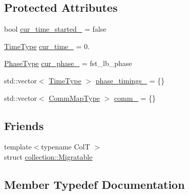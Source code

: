 \subsection*{Protected Attributes}
\begin{DoxyCompactItemize}
\item 
bool \hyperlink{structvt_1_1vrt_1_1collection_1_1balance_1_1_element_stats_a4fa029e81c6907ace700b8c3df10457f}{cur\+\_\+time\+\_\+started\+\_\+} = false
\item 
\hyperlink{namespacevt_a876a9d0cd5a952859c72de8a46881442}{Time\+Type} \hyperlink{structvt_1_1vrt_1_1collection_1_1balance_1_1_element_stats_ab0538c11d7a658e43f80c48023f7b8c6}{cur\+\_\+time\+\_\+} = 0.
\item 
\hyperlink{structvt_1_1vrt_1_1collection_1_1balance_1_1_element_stats_a6edee983bb2ae96a341763520af33c66}{Phase\+Type} \hyperlink{structvt_1_1vrt_1_1collection_1_1balance_1_1_element_stats_a661531ffc78883018a8e553179f9324d}{cur\+\_\+phase\+\_\+} = fst\+\_\+lb\+\_\+phase
\item 
std\+::vector$<$ \hyperlink{namespacevt_a876a9d0cd5a952859c72de8a46881442}{Time\+Type} $>$ \hyperlink{structvt_1_1vrt_1_1collection_1_1balance_1_1_element_stats_ac3df7cd0b637aef1e0faa92bb0193542}{phase\+\_\+timings\+\_\+} = \{\}
\item 
std\+::vector$<$ \hyperlink{namespacevt_1_1vrt_1_1collection_1_1balance_aa50d4cbbfa3c643e7303fc6e08f411fb}{Comm\+Map\+Type} $>$ \hyperlink{structvt_1_1vrt_1_1collection_1_1balance_1_1_element_stats_a1673ce54a075060ea7e04c6e300b9682}{comm\+\_\+} = \{\}
\end{DoxyCompactItemize}
\subsection*{Friends}
\begin{DoxyCompactItemize}
\item 
{\footnotesize template$<$typename ColT $>$ }\\struct \hyperlink{structvt_1_1vrt_1_1collection_1_1balance_1_1_element_stats_a7bbe05894c87d4c1c75375b8be72934d}{collection\+::\+Migratable}
\end{DoxyCompactItemize}


\subsection{Member Typedef Documentation}
\mbox{\label{structvt_1_1vrt_1_1collection_1_1balance_1_1_element_stats_a0c7e7b8fa38003b72320906f18a6ca71}} 
